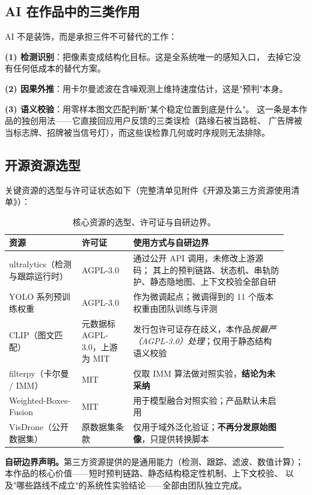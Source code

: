 \documentclass[11pt,a4paper]{ctexart}
\begin{document}
\subsection{AI 在作品中的三类作用}

AI 不是装饰，而是承担三件不可替代的工作：

\textbf{(1) 检测识别}：把像素变成结构化目标。这是全系统唯一的感知入口，
去掉它没有任何低成本的替代方案。

\textbf{(2) 因果外推}：用卡尔曼滤波在含噪观测上维持速度估计，这是"预判"本身。

\textbf{(3) 语义校验}：用零样本图文匹配判断"某个稳定位置到底是什么"。
这一条是本作品的独创用法——它直接回应用户反馈的三类误检（路缘石被当路桩、
广告牌被当标志牌、招牌被当信号灯），而这些误检靠几何或时序规则无法排除。

\subsection{开源资源选型}

关键资源的选型与许可证状态如下（完整清单见附件《开源及第三方资源使用清单》）：

\begin{table}[t]\centering\small
\caption{核心资源的选型、许可证与自研边界。}
\label{tab:res}
\begin{tabular}{p{0.24\linewidth}p{0.17\linewidth}p{0.51\linewidth}}
\toprule
资源 & 许可证 & 使用方式与自研边界 \\
\midrule
ultralytics（检测与跟踪运行时） & AGPL-3.0 & 通过公开 API 调用，未修改上游源码；
其上的预判链路、状态机、串轨防护、静态隐地图、上下文校验全部自研 \\
YOLO 系列预训练权重 & AGPL-3.0 & 作为微调起点；微调得到的 11 个版本权重由团队训练与评测 \\
CLIP（图文匹配） & 元数据标 AGPL-3.0，上游为 MIT &
发行包许可证存在歧义，本作品\emph{按最严（AGPL-3.0）处理}；仅用于静态结构语义校验 \\
filterpy（卡尔曼 / IMM） & MIT & 仅取 IMM 算法做对照实验，\textbf{结论为未采纳} \\
Weighted-Boxes-Fusion & MIT & 用于模型融合对照实验；产品默认未启用 \\
VisDrone（公开数据集） & 原数据集条款 & 仅用于域外泛化验证；\textbf{不再分发原始图像}，只提供转换脚本 \\
\bottomrule
\end{tabular}
\end{table}

\textbf{自研边界声明。}第三方资源提供的是通用能力（检测、跟踪、滤波、数值计算）；
本作品的核心价值——短时预判链路、静态结构稳定性机制、上下文校验、
以及"哪些路线不成立"的系统性实验结论——全部由团队独立完成。
\end{document}
